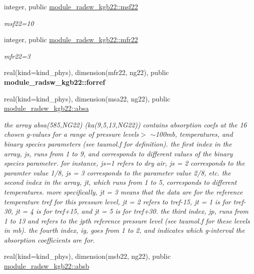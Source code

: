 \begin{Indent}
\begin{DoxyCompactItemize}
integer, public \hyperlink{group__module__radsw__kgbnn_ga0903a020c9e4a4f7c21911d2ab98fd46}{module\+\_\+radsw\+\_\+kgb22\+::msf22}
\begin{DoxyCompactList}\small\item\em msf22=10 \end{DoxyCompactList}\item 
integer, public \hyperlink{group__module__radsw__kgbnn_ga0afe8facbe4837a22c96a0d2000a20ee}{module\+\_\+radsw\+\_\+kgb22\+::mfr22}
\begin{DoxyCompactList}\small\item\em mfr22=3 \end{DoxyCompactList}\item 
real(kind=kind\+\_\+phys), dimension(mfr22, ng22), public {\bfseries module\+\_\+radsw\+\_\+kgb22\+::forref}
\item 
real(kind=kind\+\_\+phys), dimension(msa22, ng22), public \hyperlink{group__module__radsw__kgbnn_ga15ed79e7136ed6d7f11c19a81281af53}{module\+\_\+radsw\+\_\+kgb22\+::absa}
\begin{DoxyCompactList}\small\item\em the array absa(585,\+N\+G22) (ka(9,5,13,\+N\+G22)) contains absorption coefs at the 16 chosen g-\/values for a range of pressure levels$>$ $\sim$100mb, temperatures, and binary species parameters (see taumol.\+f for definition). the first index in the array, js, runs from 1 to 9, and corresponds to different values of the binary species parameter. for instance, js=1 refers to dry air, js = 2 corresponds to the paramter value 1/8, js = 3 corresponds to the parameter value 2/8, etc. the second index in the array, jt, which runs from 1 to 5, corresponds to different temperatures. more specifically, jt = 3 means that the data are for the reference temperature tref for this pressure level, jt = 2 refers to tref-\/15, jt = 1 is for tref-\/30, jt = 4 is for tref+15, and jt = 5 is for tref+30. the third index, jp, runs from 1 to 13 and refers to the jpth reference pressure level (see taumol.\+f for these levels in mb). the fourth index, ig, goes from 1 to 2, and indicates which g-\/interval the absorption coefficients are for. \end{DoxyCompactList}\item 
real(kind=kind\+\_\+phys), dimension(msb22, ng22), public \hyperlink{group__module__radsw__kgbnn_ga60403e7d343c85e965f3507b0db0f2a5}{module\+\_\+radsw\+\_\+kgb22\+::absb}

\end{DoxyCompactItemize}
\end{Indent}
